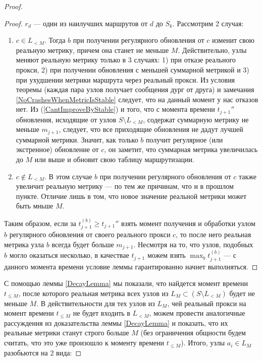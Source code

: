 \begin{proof}
\begin{proof}
         $r_d$ --- один из наилучших маршрутов от $d$ до $S_k$. Рассмотрим 2 случая:
        
        \begin{enumerate}
            \item $c \in L_{< M}$. Тогда $b$ при получении регулярного обновления от $c$ изменит свою реальную метрику, причем она станет не меньше $M$. Действительно, узлы меняют реальную метрику только в 3 случаях: 1) при отказе реального прокси, 2) при получении обновления с меньшей суммарной метрикой и 3) при ухудшении метрики маршрута через реальный прокси. Из условия теоремы (каждая пара узлов получает сообщения дург от друга) и замечания \ref{NoCrashesWhenMetricIsStable} следует, что на данный момент у нас отказов нет. Из (\ref{CantImproveByStable}) и того, что с момента времени $t_{j + 1}''$ обновления, исходящие от узлов $S \setminus L_{< M}$, содержат суммарную метрику не меньше $m_{j + 1}$, следует, что все приходящие обновления не дадут лучшей суммарной метрики. Значит, как только $b$ получит регулярное (или экстренное) обновление от $c$, он заметит, что суммарная метрика увеличилась до $M$ или выше и обновит свою таблицу маршрутизации.
            
            \item $c \notin L_{< M}$. В этом случае $b$ при получении регулярного обновления от $c$ также увеличит реальную метрику --- по тем же причинам, что и в прошлом пункте. Отличие лишь в том, что новое значение реальной метрики может быть мньше $M$.
        \end{enumerate}
        
        Таким образом, если за $t_{j + 1}^{(b)} \geq t_{j + 1}''$ взять момент получения и обработки узлом $b$ регулярного обновления от своего реального прокси $c$, то после него реальная метрика узла $b$ всегда будет больше $m_{j + 1}$. Несмотря на то, что узлов, подобных $b$ могло оказаться несколько, в качествае $t_{j + 1}$ можем взять $\displaystyle \max_b t_{j + 1}^{(b)}$ --- с данного момента времени условие леммы гарантированно начнет выполняться.
    \end{proof}
    
    С помощью леммы \ref{DecayLemma} мы показали, что найдется момент времени $t_{\leq M}$, после которого реальная метрика всех узлов из $L_M \subset (S \setminus L_{< M})$ будет не меньше $M$. В действительности для тех узлов из $L_M$, чей реальный прокси на момент времени $t_{\leq M}$ не будет входить в $L_{< M}$, можем провести аналогичные рассуждения из доказательства леммы \ref{DecayLemma} и показать, что их реальные метрики станут строго больше $M$ (без ограничения общности будем считать, что это уже произошло к моменту времени $t_{\leq M}$). Итого, узлы $a_i \in L_M$ разобьются на 2 вида:
    

\end{proof}
